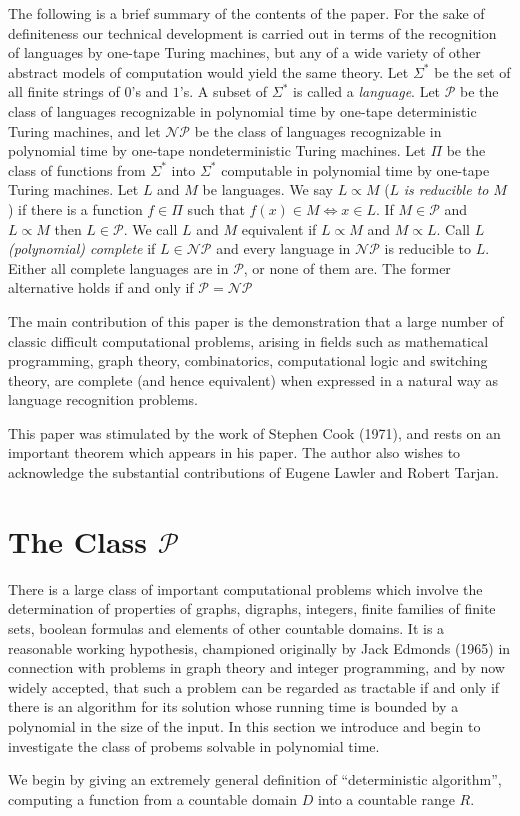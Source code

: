 \documentclass{scrartcl}
\begin{document}
The following is a brief summary of the contents of the paper.
For the sake of definiteness our technical development is carried out in terms of the recognition of languages by one-tape Turing machines, but any of a wide variety
of other abstract models of computation would yield the same theory.
Let \(\Sigma^{*}\) be the set of all finite strings of \(0\)'s and \(1\)'s.
A subset of \(\Sigma^{*}\) is called a \emph{language}.
Let \(\mathcal{P}\) be the class of languages recognizable in polynomial time by one-tape deterministic Turing machines, and let \(\mathcal{NP}\) be the class of
languages recognizable in polynomial time by one-tape nondeterministic Turing machines.
Let \(\Pi\) be the class of functions from \(\Sigma^{*}\) into \(\Sigma^{*}\) computable in polynomial time by one-tape Turing machines.
Let \(L\) and \(M\) be languages.
We say \(L \propto M\) (\(L\) \emph{is reducible to} \(M\)) if there is a function \(f \in \Pi\) such that \(f(x) \in M \Leftrightarrow x \in L\).
If \(M \in \mathcal{P}\) and \(L \propto M\) then \(L \in \mathcal{P}\).
We call \(L\) and \(M\) equivalent if \(L \propto M\) and \(M \propto L\).
Call \(L\) \emph{(polynomial) complete} if \(L \in \mathcal{NP}\) and every language in \(\mathcal{NP}\) is reducible to \(L\).
Either all complete languages are in \(\mathcal{P}\), or none of them are. The former alternative holds if and only if \(\mathcal{P} = \mathcal{NP}\)

The main contribution of this paper is the demonstration that a large number of classic difficult computational problems, arising in fields such as mathematical
programming, graph theory, combinatorics, computational logic and switching theory, are complete (and hence equivalent) when expressed in a natural way as language
recognition problems.

This paper was stimulated by the work of Stephen Cook (1971), and rests on an important theorem which appears in his paper.
The author also wishes to acknowledge the substantial contributions of Eugene Lawler and Robert Tarjan.

\section{The Class \(\mathcal{P}\)}

There is a large class of important computational problems which involve the determination of properties of graphs, digraphs, integers, finite families of finite
sets, boolean formulas and elements of other countable domains.
It is a reasonable working hypothesis, championed originally by Jack Edmonds (1965) in connection with problems in graph theory and integer programming, and by now
widely accepted, that such a problem can be regarded as tractable if and only if there is an algorithm for its solution whose running time is bounded by a polynomial
in the size of the input.
In this section we introduce and begin to investigate the class of probems solvable in polynomial time.

We begin by giving an extremely general definition of ``deterministic algorithm'', computing a function from a countable domain \(D\) into a countable range \(R\).
\end{document}
